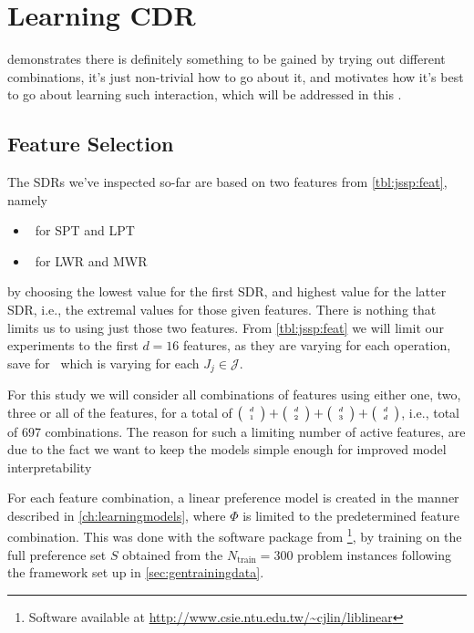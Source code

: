 \documentclass[smallextended]{svjour3}
\begin{document}

	
	\section{Learning CDR}\label{ch:expr:CDR}
	 demonstrates there is definitely something to be gained by trying out different combinations, it's just non-trivial how to go about it, and motivates how it's best to go about learning such interaction, which will be addressed in this .
	
	\subsection{Feature Selection}
	The SDRs we've inspected so-far are based on two features from \cref{tbl:jssp:feat}, namely
	\begin{itemize}
		\item \phiproc\ for SPT and LPT 
		\item \phiwrmJob\ for LWR and MWR 
	\end{itemize}
	by choosing the lowest value for the first SDR, and highest value for the latter SDR, i.e., the extremal values for those given features. 
	There is nothing that limits us to using just those two features. 
	From \cref{tbl:jssp:feat} we will limit our experiments to the first $d=16$ features, as they are varying for each operation, save for \phitotalProc\ which is varying for each $J_j\in\mathcal{J}$. 
	
	For this study we will consider all combinations of features using either one, two, three or all of the features, for a total of $\tiny \left(\begin{array}{c}d\\1\end{array}\right)+\tiny \left(\begin{array}{c}d\\2\end{array}\right)+\tiny \left(\begin{array}{c}d\\3\end{array}\right)+\tiny \left(\begin{array}{c}d\\d\end{array}\right)$, i.e., total of 697 combinations. The reason for such a limiting number of active features, are due to the fact we want to keep the models simple enough for improved model interpretability
	
	For each feature combination, a linear preference model is created in the manner described in \cref{ch:learningmodels}, where $\Phi$ is limited to the predetermined feature combination. This was done with the software package from \cite{liblinear}\footnote{Software available at \url{http://www.csie.ntu.edu.tw/~cjlin/liblinear}}, by training on the full preference set $S$ obtained from the $N_{\text{train}}=300$ problem instances following the framework set up in \cref{sec:gentrainingdata}. 
	
\end{document}
